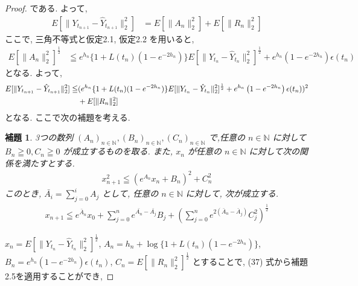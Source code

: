 \documentclass[11pt,a4paper]{ltjsarticle}
\newtheorem{lemma}[theorem]{補題}
\theoremstyle{remark}
\begin{document}
\begin{proof}
    である. よって, 
    \begin{align}
        E[\|Y_{t_{n+1}}-\hat{Y}_{t_{n+1}}\|^2_2]
        &=E[\|A_n\|^2_2]+E[\|R_n\|^2_2]
    \end{align}
    ここで, 三角不等式と仮定2.1, 仮定2.2 を用いると, 
    \begin{align}
        E[\|A_n\|^2_2]^{\frac{1}{2}}&\leqq
        e^{h_n}\{1+L(t_n)(1-e^{-2h_n})\}
        E[\|
            Y_{t_n}-\hat{Y}_{t_n}
        \|^2_2]^{\frac{1}{2}}
        +
        e^{h_n}
        \left(
            1-e^{-2h_n}
        \right)
        \epsilon(t_n)
    \end{align}
    となる.
    よって, 
    \begin{align}
        E[\|Y_{t_{n+1}}-\hat{Y}_{t_{n+1}}\|^2_2]\leqq& (        e^{h_n}\{1+L(t_n)(1-e^{-2h_n})\}
        E[\|
            Y_{t_n}-\hat{Y}_{t_n}
        \|^2_2]^{\frac{1}{2}}
        +
        e^{h_n}
        \left(
            1-e^{-2h_n}
        \right)
        \epsilon(t_n))^2\notag\\
        &+E[\|R_n\|^2_2]
    \end{align}
    となる. ここで次の補題を考える.
    \begin{lemma}
        3つの数列 $(A_n)_{n\in\mathbb{N}}, (B_n)_{n\in\mathbb{N}}, (C_n)_{n\in\mathbb{N}}$ で,任意の $n\in\mathbb{N}$ に対して $B_n\geqq 0,C_n\geqq 0$ が成立するものを取る.
        また, $x_n$ が任意の $n\in\mathbb{N}$ に対して次の関係を満たすとする. 
        \begin{align}
            x^2_{n+1}\leqq (e^{A_n}x_n+B_n)^2+C^2_n
        \end{align}
        このとき, $\bar{A_i}=\sum\limits_{j=0}^{i}A_j$ として, 任意の $n\in\mathbb{N}$ に対して, 次が成立する.
        \begin{align}
            x_{n+1}\leqq e^{\bar{A}_n}x_0+\sum_{j=0}^{n}e^{\bar{A_n}-\bar{A_j}}B_j+(\sum_{j=0}^{n}e^{2(\bar{A}_n-\bar{A}_j)}C^2_j)^\frac{1}{2}
        \end{align}
    \end{lemma}
    $x_n=E[\|Y_{t_n}-\hat{Y}_{t_n}\|^2_2]^{\frac{1}{2}}$, $A_n=h_n+\log{\{1+L(t_n)(1-e^{-2h_n})\}}$, $B_n=e^{h_n}(1-e^{-2h_n})\epsilon(t_n)$, $C_n=E[\|R_n\|^2_2]^\frac{1}{2}$
    とすることで, (37) 式から補題2.5を適用することができ, 


\end{proof}
\end{document}
